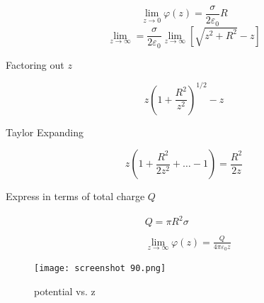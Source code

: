 \documentclass[svgnames]{article}   	%
\begin{document}
\vspace{5px} \[
  \lim_{z\to 0} \varphi(z) = \frac{\sigma}{2\varepsilon_0}R
\] \vspace{5px}
\[
  \lim_{z \to \infty} = \frac{\sigma}{2\varepsilon_0} \lim_{z \to \infty}
  [ \sqrt{z^2 + R^2} - z] 
\]

Factoring out $z$ 

\vspace{5px} \[
  z \left(1 + \frac{R^2}{z^2} \right)^{1/2} - z
\] \vspace{5px}

Taylor Expanding 

\vspace{5px} \[
z(1 + \frac{R^2}{2z^2} + \dots - 1 ) = \frac{R^2}{2z}
\] \vspace{5px}

Express in terms of total charge $Q$ 

\begin{align*}
  &Q = \pi R^2 \sigma \\\\
  &\lim_{z \to \infty} \varphi(z) = \frac{Q}{4\pi \varepsilon_0 z} 
\end{align*}



\begin{figure}[H]
  \centering
    \texttt{[image: screenshot 90.png]}
    \caption{potential vs. z}
\end{figure}
\end{document}
